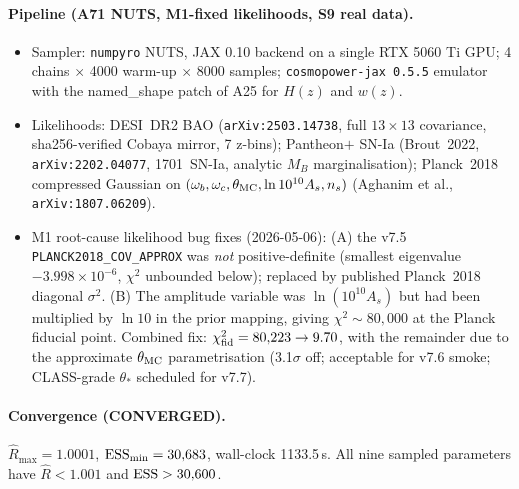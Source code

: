 \documentclass[a4paper,11pt]{article}
\theoremstyle{definition}
\theoremstyle{remark}
\begin{document}
\paragraph{Pipeline (A71 NUTS, M1-fixed likelihoods, S9 real data).}
\begin{itemize}
\item Sampler: \texttt{numpyro} NUTS, JAX 0.10 backend on a single
RTX 5060 Ti GPU; 4 chains $\times$ 4000 warm-up $\times$ 8000 samples;
\texttt{cosmopower-jax 0.5.5} emulator with the named\_shape patch
of A25 for $H(z)$ and $w(z)$.
\item Likelihoods: DESI~DR2 BAO (\texttt{arXiv:2503.14738}, full
$13\times 13$ covariance, sha256-verified Cobaya mirror, 7 z-bins);
Pantheon$+$ SN-Ia (Brout~2022, \texttt{arXiv:2202.04077}, 1701~SN-Ia,
analytic $M_{B}$ marginalisation); Planck~2018 compressed Gaussian
on $(\omega_{b},\omega_{c},\theta_{\rm MC},\ln 10^{10}A_{s},n_{s})$
(Aghanim et al., \texttt{arXiv:1807.06209}).
\item M1 root-cause likelihood bug fixes (2026-05-06):
(A) the v7.5 \texttt{PLANCK2018\_COV\_APPROX} was \emph{not}
positive-definite (smallest eigenvalue $-3.998\times 10^{-6}$,
$\chi^{2}$ unbounded below); replaced by published Planck~2018
diagonal $\sigma^{2}$.  (B) The amplitude variable was
$\ln(10^{10}A_{s})$ but had been multiplied by $\ln 10$ in the prior
mapping, giving $\chi^{2}\sim 80{,}000$ at the Planck fiducial point.
Combined fix: $\chi^{2}_{\rm fid}=80{,}223 \to 9.70$, with the
remainder due to the approximate $\theta_{\rm MC}$ parametrisation
(3.1$\sigma$ off; acceptable for v7.6 smoke; CLASS-grade
$\theta_{*}$ scheduled for v7.7).
\end{itemize}

\paragraph{Convergence (CONVERGED).}
$\hat{R}_{\max}=1.0001$, ${\rm ESS}_{\min}=30{,}683$, wall-clock
1133.5\,s.  All nine sampled parameters have $\hat{R}<1.001$ and
${\rm ESS}>30{,}600$.
\end{document}
